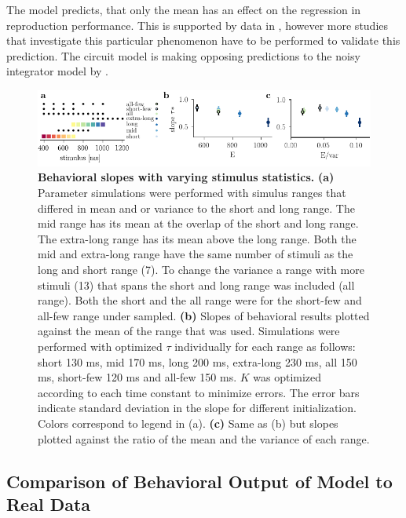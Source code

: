 \documentclass[10pt]{article}
\begin{document}
The model predicts, that only the mean has an effect on the regression in reproduction performance. This is supported by data in \cite{Petzschner2012}, however more studies that investigate this particular phenomenon have to be performed to validate this prediction. 
The circuit model is making opposing predictions to the noisy integrator model by \cite{Thurley2016}.

\begin{figure}[ht]
	\centering
	\includegraphics{figures/ranges_new2.pdf}
	\caption{\textbf{Behavioral slopes with varying stimulus statistics.} 
	\textbf{(a)} Parameter simulations were performed with simulus ranges that differed in mean and or variance to the short and long range. The mid range has its mean at the overlap of the short and long range. The extra-long range has its mean above the long range. Both the mid and extra-long range have the same number of stimuli as the long and short range (7). To change the variance a range with more stimuli (13) that spans the short and long range was included (all range). Both the short and the all range were for the short-few and all-few range under sampled.
	\textbf{(b)} Slopes of behavioral results plotted against the mean of the range that was used. Simulations were performed with optimized $\tau$ individually for each range as follows: short 130 ms, mid 170 ms, long 200 ms, extra-long 230 ms, all 150 ms, short-few 120 ms and all-few 150 ms. $K$ was optimized according to each time constant to minimize errors. The error bars indicate standard deviation in the slope for different initialization. Colors correspond to legend in (a).
	\textbf{(c)} Same as (b) but slopes plotted against the ratio of the mean and the variance of each range. 
	}
\label{fig:new_ranges}
\end{figure}

\subsection{Comparison of Behavioral Output of Model to Real Data}
\end{document}

